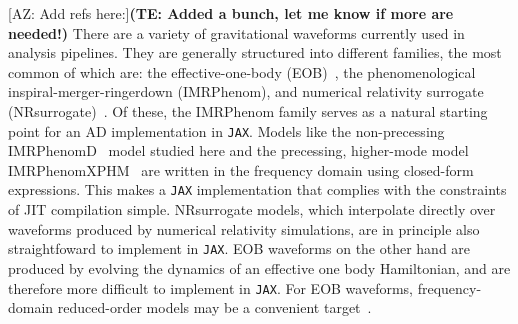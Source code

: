 \documentclass[twocolumn]{aastex631}
\newcommand{\jax}{\texttt{JAX}\xspace}
\newcommand{\te}[1]{\textbf{\color{pyGreen}(TE: #1)}}
\newcommand{\AZ}[1]{{\color{Burnt}[AZ: #1]}}
\begin{document}
\AZ{Add refs here:}\te{Added a bunch, let me know if more are needed!}
There are a variety of gravitational waveforms currently used in analysis pipelines.
They are generally structured into different families, the most common of which are: the effective-one-body (EOB)~\citep{Damour:2008yg,Buonanno:2005xu, Buonanno:2000ef, Buonanno:1998gg, Damour:2000we}, the phenomenological inspiral-merger-ringerdown (IMRPhenom), and numerical relativity surrogate (NRsurrogate)~\citep{Varma:2018mmi,Varma:2019csw}.
Of these, the IMRPhenom family serves as a natural starting point for an AD implementation in \jax.
Models like the non-precessing IMRPhenomD~\citep{Khan:2015jqa} model studied here and the precessing, higher-mode model IMRPhenomXPHM~\citep{Pratten:2020fqn, Pratten:2020ceb} are written in the frequency domain using closed-form expressions.
This makes a
\jax implementation that complies with the constraints of JIT compilation simple.
NRsurrogate models, which interpolate directly over waveforms produced by numerical relativity simulations, are in principle also straightfoward to implement in \jax.
EOB waveforms on the other hand are produced by evolving the dynamics of an effective one body Hamiltonian, and are therefore more difficult to implement in \jax.
For EOB waveforms, frequency-domain reduced-order models may be a convenient target~\citep[e.g.][]{Cotesta:2020qhw}.
\end{document}
